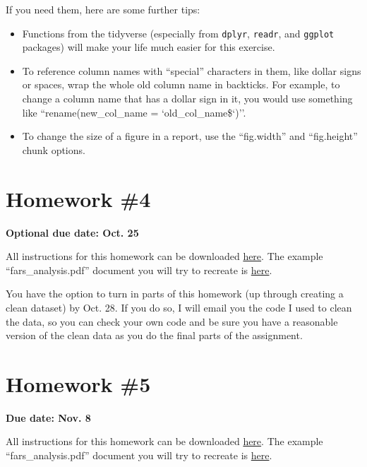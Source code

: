 \documentclass[]{book}
\providecommand{\tightlist}{%
  \setlength{\itemsep}{0pt}\setlength{\parskip}{0pt}}
\theoremstyle{definition}
\theoremstyle{definition}
\theoremstyle{definition}
\theoremstyle{remark}
\begin{document}
If you need them, here are some further tips:

\begin{itemize}
\tightlist
\item
  Functions from the tidyverse (especially from \texttt{dplyr},
  \texttt{readr}, and \texttt{ggplot} packages) will make your life much
  easier for this exercise.
\item
  To reference column names with ``special'' characters in them, like
  dollar signs or spaces, wrap the whole old column name in backticks.
  For example, to change a column name that has a dollar sign in it, you
  would use something like ``rename(new\_col\_name =
  `old\_col\_name\$`)''.
\item
  To change the size of a figure in a report, use the ``fig.width'' and
  ``fig.height'' chunk options.
\end{itemize}

\section{Homework \#4}\label{homework-4}

\textbf{Optional due date: Oct. 25}

All instructions for this homework can be downloaded
\href{https://github.com/geanders/RProgrammingForResearch/raw/master/Homework/Homework4and5.pdf}{here}.
The example ``fars\_analysis.pdf'' document you will try to recreate is
\href{https://github.com/geanders/RProgrammingForResearch/raw/master/Homework/fars_analysis.pdf}{here}.

You have the option to turn in parts of this homework (up through
creating a clean dataset) by Oct. 28. If you do so, I will email you the
code I used to clean the data, so you can check your own code and be
sure you have a reasonable version of the clean data as you do the final
parts of the assignment.

\section{Homework \#5}\label{homework-5}

\textbf{Due date: Nov. 8}

All instructions for this homework can be downloaded
\href{https://github.com/geanders/RProgrammingForResearch/raw/master/Homework/Homework4and5.pdf}{here}.
The example ``fars\_analysis.pdf'' document you will try to recreate is
\href{https://github.com/geanders/RProgrammingForResearch/raw/master/Homework/fars_analysis.pdf}{here}.
\end{document}
